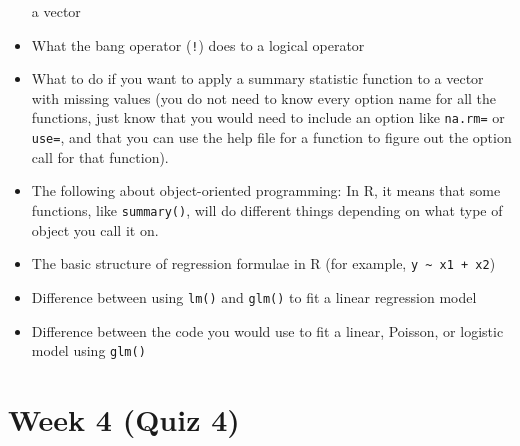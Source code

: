 \documentclass[]{book}
\theoremstyle{definition}
\theoremstyle{definition}
\theoremstyle{definition}
\theoremstyle{remark}
\begin{document}
\begin{itemize}
  a vector
\item
  What the bang operator (\texttt{!}) does to a logical operator
\item
  What to do if you want to apply a summary statistic function to a
  vector with missing values (you do not need to know every option name
  for all the functions, just know that you would need to include an
  option like \texttt{na.rm=} or \texttt{use=}, and that you can use the
  help file for a function to figure out the option call for that
  function).
\item
  The following about object-oriented programming: In R, it means that
  some functions, like \texttt{summary()}, will do different things
  depending on what type of object you call it on.
\item
  The basic structure of regression formulae in R (for example,
  \texttt{y\ \textasciitilde{}\ x1\ +\ x2})
\item
  Difference between using \texttt{lm()} and \texttt{glm()} to fit a
  linear regression model
\item
  Difference between the code you would use to fit a linear, Poisson, or
  logistic model using \texttt{glm()}
\end{itemize}

\section{Week 4 (Quiz 4)}\label{week-4-quiz-4}
\end{document}
